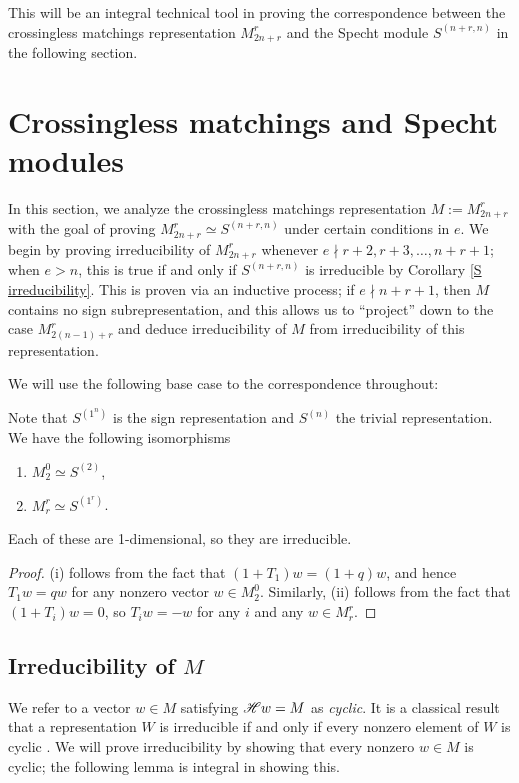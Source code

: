 \documentclass{amsart}
\begin{document}
This will be an integral technical tool in proving the correspondence between the crossingless matchings representation $M_{2n + r}^r$ and the Specht module $S^{(n+r,n)}$ in the following section. 

\section{Crossingless matchings and Specht modules}\label{Crossingless Matchings Section}
In this section, we analyze the crossingless matchings representation $M := M_{2n + r}^r$ with the goal of proving $M_{2n + r}^r \simeq S^{(n+r,n)}$ under certain conditions in $e$.
We begin by proving irreducibility of $M_{2n + r}^r$ whenever $e \nmid r+2,r+3,\dots,n+r+1$;
when $e>n$, this is true if and only if $S^{(n+r,n)}$ is irreducible by Corollary \ref{S irreducibility}.
This is proven via an inductive process; if $e \nmid n + r + 1$, then $M$ contains no sign subrepresentation, and this allows us to ``project'' down to the case $M_{2(n-1) + r}^r$ and deduce irreducibility of $M$ from irreducibility of this representation.

We will use the following base case to the correspondence throughout:
\begin{lemma}\label{Base cases}
  Note that $S^{(1^n)}$ is the sign representation and $S^{(n)}$ the trivial representation.
  We have the following isomorphisms
  \begin{enumerate}[label={(\roman*)}]
    \item $M_2^0 \simeq S^{(2)}$,
    \item $M_r^r \simeq S^{(1^r)}$.
  \end{enumerate}
  Each of these are 1-dimensional, so they are irreducible.
\end{lemma}
\begin{proof}
  (i) follows from the fact that $(1 + T_1)w = (1 + q)w$, and hence $T_1w = qw$ for any nonzero vector $w \in M_2^0$.
  Similarly, (ii) follows from the fact that $(1 + T_i)w = 0$, so $T_iw = -w$ for any $i$ and any $w \in M_r^r$.
\end{proof}

\subsection{Irreducibility of $M$}
We refer to a vector $w \in M$ satisfying $\mathscr{H} w = M$ as \emph{cyclic}.
It is a classical result that a representation $W$ is irreducible if and only if every nonzero element of $W$ is cyclic \cite{Etingof}.
We will prove irreducibility by showing that every nonzero $w \in M$ is cyclic;
the following lemma is integral in showing this.
\end{document}
